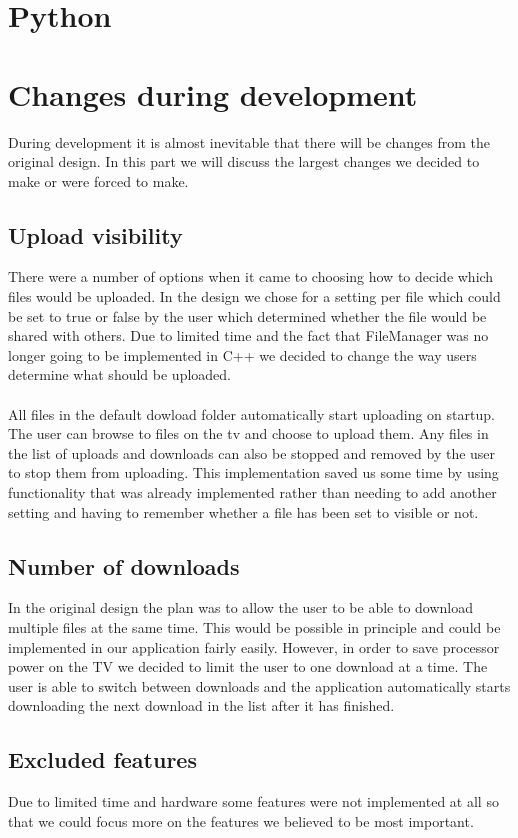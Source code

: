 \section{Python}

\section{Changes during development}

During development it is almost inevitable that there will be changes from the original design. In this part we will discuss the largest changes we decided to make or were forced to make.

\subsection{Upload visibility}

There were a number of options when it came to choosing how to decide which files would be uploaded. In the design we chose for a setting per file which could be set to true or false by the user which determined whether the file would be shared with others. Due to limited time and the fact that FileManager was no longer going to be implemented in C++ we decided to change the way users determine what should be uploaded.
\\\\
All files in the default dowload folder automatically start uploading on startup. The user can browse to files on the tv and choose to upload them. Any files in the list of uploads and downloads can also be stopped and removed by the user to stop them from uploading. This implementation saved us some time by using functionality that was already implemented rather than needing to add another setting and having to remember whether a file has been set to visible or not.

\subsection{Number of downloads}

In the original design the plan was to allow the user to be able to download multiple files at the same time. This would be possible in principle and could be implemented in our application fairly easily. However, in order to save processor power on the TV we decided to limit the user to one download at a time. The user is able to switch between downloads and the application automatically starts downloading the next download in the list after it has finished.

\subsection{Excluded features}

Due to limited time and hardware some features were not implemented at all so that we could focus more on the features we believed to be most important.

